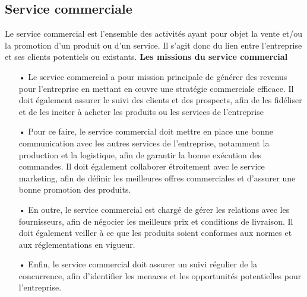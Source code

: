 \documentclass[edit,12pt,a4paper,ChapStyle,oneside,doubleinterligne]{report}
\begin{document}
\subsection{Service commerciale}
Le service commercial est l’ensemble des activités ayant pour objet la vente et/ou la promotion d’un produit ou d’un service. Il s’agit donc du lien entre l’entreprise et ses clients potentiels ou existants.
\cite{Service}\newline\textbf{Les missions du service commercial}\newline
\begin{itemize}
    \item [•]   Le service commercial a pour mission principale de générer des revenus pour l’entreprise en mettant en œuvre une stratégie commerciale efficace. Il doit également assurer le suivi des clients et des prospects, afin de les fidéliser et de les inciter à acheter les produits ou les services de l’entreprise
    \item [•]	Pour ce faire, le service commercial doit mettre en place une bonne communication avec les autres services de l’entreprise, notamment la production et la logistique, afin de garantir la bonne exécution des commandes. Il doit également collaborer étroitement avec le service marketing, afin de définir les meilleures offres commerciales et d’assurer une bonne promotion des produits.
    \item [•]   En outre, le service commercial est chargé de gérer les relations avec les fournisseurs, afin de négocier les meilleurs prix et conditions de livraison. Il doit également veiller à ce que les produits soient conformes aux normes et aux réglementations en vigueur.
    \item [•]   Enfin, le service commercial doit assurer un suivi régulier de la concurrence, afin d’identifier les menaces et les opportunités potentielles pour l’entreprise.
\end{itemize}
\end{document}
